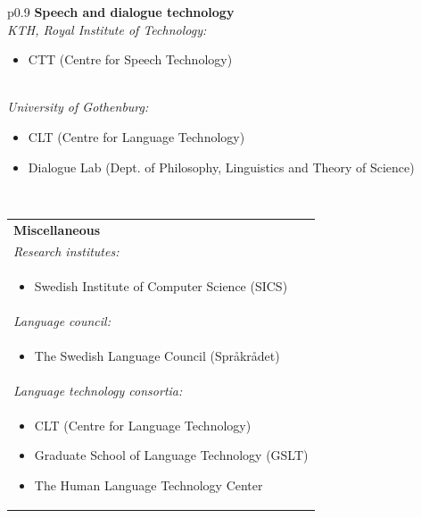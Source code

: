\begin{multicols}{2}
\begin{minipage}[t]{\linewidth}
\begin{tabular}{p{0.9\columnwidth}}
{\textbf{Speech and dialogue technology}} \\
{\emph{KTH, Royal Institute of Technology:}} \\
\begin{itemize} \item \vspace{-20pt} CTT (Centre for Speech Technology) \vspace{-10pt} \end{itemize} \\
{\emph{University of Gothenburg:}} \\
\parbox[b]{0.9\columnwidth}{%
\begin{itemize}
\item CLT (Centre for Language Technology)
\item Dialogue Lab (Dept. of Philosophy, Linguistics and Theory of Science)
\end{itemize}} \\
\end{tabular}
\end{minipage}

\begin{minipage}[t]{\linewidth}
\begin{tabular}{p{}}
{\textbf{Miscellaneous}} \\
{\emph{Research institutes:}} \\
\begin{itemize} \item \vspace{-20pt} Swedish Institute of Computer Science (SICS) \vspace{-10pt}  \end{itemize} \\
{\emph{Language council:}} \\
\begin{itemize} \item \vspace{-20pt} The Swedish Language Council (Språkrådet) \vspace{-10pt}  \end{itemize} \\
{\emph{\footnotesize{Language technology consortia:}}} \\
\parbox[b]{0.9\columnwidth}{%
\begin{itemize}
\item CLT (Centre for Language Technology)
\item Graduate School of Language Tech\-nology (GSLT)
\item The Human Language Technology Center
\end{itemize}} \\ 
\end{tabular}
\end{minipage}


\end{multicols}
